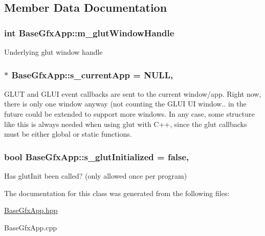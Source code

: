 \subsection{Member Data Documentation}
\hypertarget{classBaseGfxApp_ad8697d6fdd10e6f336c3a662016b4fa7}{
\subsubsection[{m\-\_\-glut\-Window\-Handle}]{\setlength{\rightskip}{0pt plus 5cm}int Base\-Gfx\-App\-::m\-\_\-glut\-Window\-Handle\hspace{0.3cm}{\ttfamily [protected]}}}\label{classBaseGfxApp_ad8697d6fdd10e6f336c3a662016b4fa7}
Underlying glut window handle \hypertarget{classBaseGfxApp_a65ba89b98af31e2649a0546631931000}{
\subsubsection[{s\-\_\-current\-App}]{ $\ast$ Base\-Gfx\-App\-::s\-\_\-current\-App = N\-U\-L\-L\hspace{0.3cm}{\ttfamily [static]}, {\ttfamily [protected]}}}\label{classBaseGfxApp_a65ba89b98af31e2649a0546631931000}
G\-L\-U\-T and G\-L\-U\-I event callbacks are sent to the current window/app. Right now, there is only one window anyway (not counting the G\-L\-U\-I U\-I window.. in the future could be extended to support more windows. In any case, some structure like this is always needed when using glut with C++, since the glut callbacks must be either global or static functions. \hypertarget{classBaseGfxApp_afa4690383ea27713016ef75b9fb1e42f}{
\subsubsection[{s\-\_\-glut\-Initialized}]{\setlength{\rightskip}{0pt plus 5cm}bool Base\-Gfx\-App\-::s\-\_\-glut\-Initialized = false\hspace{0.3cm}{\ttfamily [static]}, {\ttfamily [protected]}}}\label{classBaseGfxApp_afa4690383ea27713016ef75b9fb1e42f}
Has glut\-Init been called? (only allowed once per program) 

The documentation for this class was generated from the following files\-:\begin{DoxyCompactItemize}
\item 
\hyperlink{BaseGfxApp_8hpp}{Base\-Gfx\-App.\-hpp}\item 
Base\-Gfx\-App.\-cpp\end{DoxyCompactItemize}
